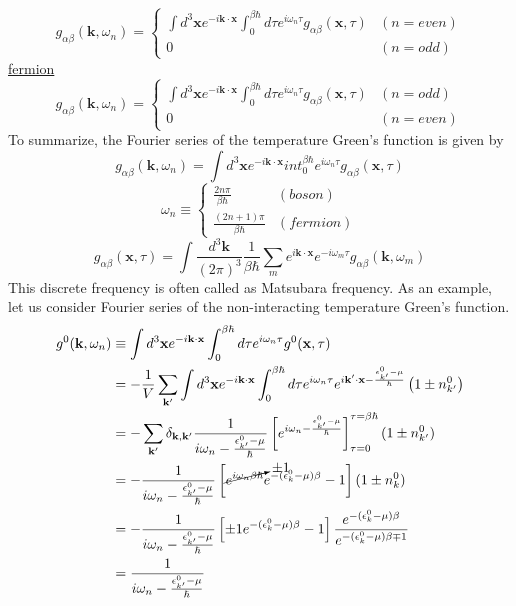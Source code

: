 $$
g_{\alpha\beta}(\mathbf{k},\omega_n)=
\begin{cases}
\int d^3 \mathbf{x} e^{-i\mathbf{k}\cdot\mathbf{x}}\int_0^{\beta\hbar} d\tau e^{i\omega_n\tau} g_{\alpha\beta}(\mathbf{x},\tau)&(n=even)\\
0&(n=odd)
\end{cases}
$$
\uline{fermion}
$$
g_{\alpha\beta}(\mathbf{k},\omega_n)=
\begin{cases}
\int d^3 \mathbf{x} e^{-i\mathbf{k}\cdot\mathbf{x}}\int_0^{\beta\hbar} d\tau e^{i\omega_n\tau} g_{\alpha\beta}(\mathbf{x},\tau)&(n=odd)\\
0&(n=even)
\end{cases}
$$
To summarize, the Fourier series of the temperature Green's function is given by
\begin{equation}
g_{\alpha\beta}(\mathbf{k},\omega_n)=\int d^3\mathbf{x} e^{-i\mathbf{k}\cdot\mathbf{x}} int_0^{\beta\hbar} e^{i\omega_n\tau}g_{\alpha\beta}(\mathbf{x},\tau)
\end{equation}
\begin{equation}
\omega_n\equiv
\begin{cases}
\frac{2n\pi}{\beta\hbar} &(boson)\\
\frac{(2n+1)\pi}{\beta\hbar} &(fermion)
\end{cases}
\end{equation}
\begin{equation}
g_{\alpha\beta}(\mathbf{x},\tau)=\int \frac{d^3\mathbf{k}}{(2\pi)^3} \frac{1}{\beta\hbar} \sum_m e^{i\mathbf{k}\cdot\mathbf{x}} e^{-i\omega_m\tau}g_{\alpha\beta}(\mathbf{k},\omega_m)
\end{equation}
This discrete frequency is often called as Matsubara frequency.
As an example, let us consider Fourier series of the non-interacting temperature Green's function.
\begin{equation}
\begin{aligned}
g^0(\mathbf{k},\omega_n)&\equiv \int d^3\mathbf{x} e^{-i\mathbf{k}\cdot\mathbf{x}} \int_0^{\beta\hbar} d\tau e^{i\omega_n\tau} g^0(\mathbf{x},\tau)\\
&=-\frac{1}{V}\sum_{\mathbf{k}'} \int d^3\mathbf{x} e^{-i\mathbf{k}\cdot\mathbf{x}} \int_0^{\beta\hbar} d\tau e^{i\omega_n\tau} e^{i\mathbf{k}'\cdot\mathbf{x}-\frac{\epsilon^0_{k'}-\mu}{\hbar}} \left(1\pm n_{k'}^0\right)\\
&=-\sum_{\mathbf{k}'} \delta_{\mathbf{k},\mathbf{k}'} \frac{1}{i\omega_n-\frac{\epsilon^0_{k'}-\mu}{\hbar}}\left[e^{i\omega_n-\frac{\epsilon^0_{k'}-\mu}{\hbar}}\right]_{\tau=0}^{\tau=\beta\hbar}(1\pm n_{k'}^0)\\
&=-\frac{1}{i\omega_n-\frac{\epsilon^0_{k'}-\mu}{\hbar}}\left[\cancelto{\pm1}{e^{i\omega_n\beta\hbar}} e^{-(\epsilon_k^0-\mu)\beta}-1\right] (1\pm n_k^0)\\
&=-\frac{1}{i\omega_n-\frac{\epsilon^0_{k'}-\mu}{\hbar}}\left[\pm1 e^{-(\epsilon_k^0-\mu)\beta}-1\right] \frac{e^{-(\epsilon_k^0-\mu)\beta}}{e^{-(\epsilon_k^0-\mu)\beta\mp1}}\\
&=\frac{1}{i\omega_n-\frac{\epsilon^0_{k'}-\mu}{\hbar}}
\end{aligned}
\end{equation}
